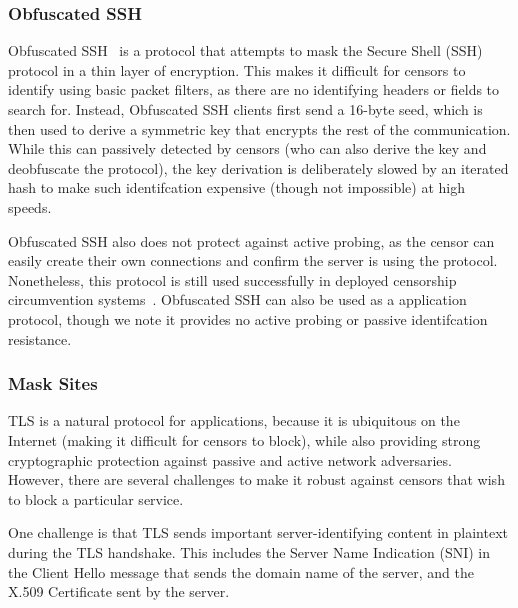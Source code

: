 \documentclass[sigconf]{acmart}
\begin{document}



\subsubsection{Obfuscated SSH}
\label{sec:ossh}

Obfuscated SSH~\cite{ossh} is a protocol that attempts to mask the Secure Shell
(SSH) protocol in a thin
layer of encryption. This makes it difficult for censors to identify using basic
packet filters, as there are no identifying headers or fields
to search for. Instead, Obfuscated SSH clients first send a 16-byte seed, which
is then used to derive a symmetric key that encrypts the rest of the
communication. While this can passively detected by censors (who can also
derive the key and deobfuscate the protocol), the key derivation is deliberately
slowed by an iterated hash to make such identifcation
expensive (though not impossible) at high speeds.

Obfuscated SSH also does not protect against active probing, as the censor can
easily create their own connections and confirm the server is using the
protocol. Nonetheless, this protocol is still used successfully in deployed censorship
circumvention systems~\cite{psiphon}. Obfuscated SSH can also be used as a \scheme
application protocol, though we note it provides no active probing or passive
identifcation resistance.

\subsubsection{Mask Sites}
\label{sec:mask-sites}

TLS is a natural protocol for \scheme applications, because it is ubiquitous on
the Internet (making it difficult for censors to block), while also providing
strong cryptographic protection against passive and active network adversaries.
However, there are several challenges to make it robust against censors that
wish to block a particular service.

One challenge is that TLS sends important server-identifying content in plaintext
during the TLS handshake. This includes the Server Name Indication (SNI) in the
Client Hello message that sends the domain name of the server, and the
X.509 Certificate sent by the server.
\end{document}

